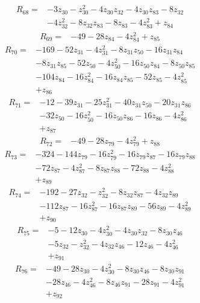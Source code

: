 \begin{align*}
R_{68}={}&-3z_{30}-z_{30}^{2}-4z_{30}z_{32}-4z_{30}z_{83}-8z_{32}\\
&-4z_{32}^{2}-8z_{32}z_{83}-8z_{83}-4z_{83}^{2}+z_{84}
\end{align*}
\begin{align*}
R_{69}={}&-49-28z_{84}-4z_{84}^{2}+z_{85}
\end{align*}
\begin{align*}
R_{70}={}&-169-52z_{31}-4z_{31}^{2}-8z_{31}z_{50}-16z_{31}z_{84}\\
&-8z_{31}z_{85}-52z_{50}-4z_{50}^{2}-16z_{50}z_{84}-8z_{50}z_{85}\\
&-104z_{84}-16z_{84}^{2}-16z_{84}z_{85}-52z_{85}-4z_{85}^{2}\\
&+z_{86}
\end{align*}
\begin{align*}
R_{71}={}&-12-39z_{31}-25z_{31}^{2}-40z_{31}z_{50}-20z_{31}z_{86}\\
&-32z_{50}-16z_{50}^{2}-16z_{50}z_{86}-16z_{86}-4z_{86}^{2}\\
&+z_{87}
\end{align*}
\begin{align*}
R_{72}={}&-49-28z_{79}-4z_{79}^{2}+z_{88}
\end{align*}
\begin{align*}
R_{73}={}&-324-144z_{79}-16z_{79}^{2}-16z_{79}z_{87}-16z_{79}z_{88}\\
&-72z_{87}-4z_{87}^{2}-8z_{87}z_{88}-72z_{88}-4z_{88}^{2}\\
&+z_{89}
\end{align*}
\begin{align*}
R_{74}={}&-192-27z_{32}-z_{32}^{2}-8z_{32}z_{87}-4z_{32}z_{89}\\
&-112z_{87}-16z_{87}^{2}-16z_{87}z_{89}-56z_{89}-4z_{89}^{2}\\
&+z_{90}
\end{align*}
\begin{align*}
R_{75}={}&-5-12z_{30}-4z_{30}^{2}-4z_{30}z_{32}-8z_{30}z_{46}\\
&-5z_{32}-z_{32}^{2}-4z_{32}z_{46}-12z_{46}-4z_{46}^{2}\\
&+z_{91}
\end{align*}
\begin{align*}
R_{76}={}&-49-28z_{30}-4z_{30}^{2}-8z_{30}z_{46}-8z_{30}z_{91}\\
&-28z_{46}-4z_{46}^{2}-8z_{46}z_{91}-28z_{91}-4z_{91}^{2}\\
&+z_{92}
\end{align*}
